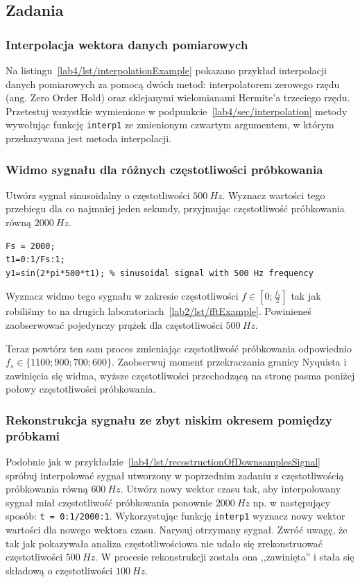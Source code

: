 \subsection{Zadania}
\subsubsection{Interpolacja wektora danych pomiarowych}
Na listingu~\ref{lab4/lst/interpolationExample} pokazano przykład interpolacji danych pomiarowych za pomocą dwóch metod: interpolatorem zerowego rzędu (ang. Zero Order Hold) oraz sklejanymi wielomianami Hermite'a trzeciego rzędu. Przetestuj wszystkie wymienione w podpunkcie~\ref{lab4/sec/interpolation} metody wywołując funkcję \texttt{interp1} ze zmienionym czwartym argumentem, w którym przekazywana jest metoda interpolacji.
\subsubsection{Widmo sygnału dla różnych częstotliwości próbkowania}
Utwórz sygnał sinusoidalny o częstotliwości $500~Hz$. Wyznacz wartości tego przebiegu dla co najmniej jeden sekundy, przyjmując częstotliwość próbkowania równą $2000~Hz$.
\begin{lstlisting}[caption=Tworzenie sygnału sinusoidalnego o częstotliwości $500~Hz$ i częstotliwości próbkowania $2000~Hz$, label=lab4/lst/recostructionOfDownsamplesSignal]
Fs = 2000;
t1=0:1/Fs:1;
y1=sin(2*pi*500*t1); % sinusoidal signal with 500 Hz frequency
\end{lstlisting}
Wyznacz widmo tego sygnału w zakresie częstotliwości $f\in[0;\frac{f_s}{2}]$ tak jak robiliśmy to na drugich laboratoriach~\ref{lab2/lst/fftExample}. Powinieneś zaobserwować pojedynczy prążek dla częstotliwości $500~Hz$.

Teraz powtórz ten sam proces zmieniając częstotliwość próbkowania odpowiednio $f_s \in \{1100; 900; 700; 600\}$. Zaobserwuj moment przekraczania granicy Nyquista i zawinięcia się widma, wyższe częstotliwości przechodzącą na stronę pasma poniżej połowy częstotliwości próbkowania.


\subsubsection{Rekonstrukcja sygnału ze zbyt niskim okresem pomiędzy próbkami}
Podobnie jak w przykładzie~\ref{lab4/lst/recostructionOfDownsamplesSignal} spróbuj interpolować sygnał utworzony w poprzednim zadaniu z częstotliwością próbkowania równą $600~Hz$. Utwórz nowy wektor czasu tak, aby interpolowany sygnał miał częstotliwość próbkowania ponownie $2000~Hz$ np. w następujący sposób: \texttt{t = 0:1/2000:1}. Wykorzystując funkcję \texttt{interp1} wyznacz nowy wektor wartości dla nowego wektora czasu. Narysuj otrzymany sygnał. Zwróć uwagę, że tak jak pokazywała analiza częstotliwościowa nie udało się zrekonstruować częstotliwości $500~Hz$. W procesie rekonstrukcji została ona ,,zawinięta'' i stała się składową o częstotliwości $100~Hz$.